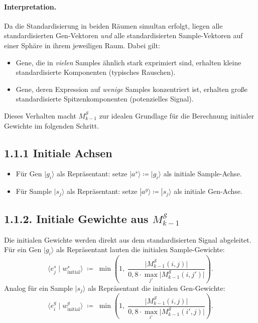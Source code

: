 \paragraph{Interpretation.}
Da die Standardisierung in beiden R\"{a}umen simultan erfolgt, liegen
alle standardisierten Gen-Vektoren \emph{und} alle standardisierten
Sample-Vektoren auf einer Sph\"{a}re in ihrem jeweiligen Raum.  Dabei gilt:
\begin{itemize}
  \item Gene, die in \emph{vielen} Samples \"{a}hnlich stark exprimiert sind,
        erhalten kleine standardisierte Komponenten (typisches Rauschen).
  \item Gene, deren Expression auf \emph{wenige} Samples konzentriert ist,
        erhalten gro{\ss}e standardisierte Spitzenkomponenten
        (potenzielles Signal).
\end{itemize}
Dieses Verhalten macht $M^{\mathcal{S}}_{k-1}$ zur idealen Grundlage f\"{u}r
die Berechnung initialer Gewichte im folgenden Schritt.
 
\subsection*{1.1.1 Initiale Achsen}
 
\begin{itemize}
  \item F\"{u}r Gen $|g_i\rangle$ als Repr\"{a}sentant: setze
        $|a^s\rangle \coloneqq |g_i\rangle$ als initiale Sample-Achse.
  \item F\"{u}r Sample $|s_j\rangle$ als Repr\"{a}sentant: setze
        $|a^g\rangle \coloneqq |s_j\rangle$ als initiale Gen-Achse.
\end{itemize}
 
\subsection*{1.1.2. Initiale Gewichte aus $M^{\mathcal{S}}_{k-1}$}
 
Die initialen Gewichte werden direkt aus dem standardisierten Signal
abgeleitet.  F\"{u}r ein Gen $|g_i\rangle$ als Repr\"{a}sentant lauten die
initialen Sample-Gewichte:
\begin{equation}
    \langle e^s_j \mid w^s_{\mathrm{initial}} \rangle
    \;\coloneqq\;
    \min\!\left(1,\;
        \frac{\bigl|M^{\mathcal{S}}_{k-1}(i,j)\bigr|}
             {0{,}8 \cdot \max_{j'}\bigl|M^{\mathcal{S}}_{k-1}(i,j')\bigr|}
    \right).
\end{equation}
Analog f\"{u}r ein Sample $|s_j\rangle$ als Repr\"{a}sentant die initialen Gen-Gewichte:
\begin{equation}
    \langle e^g_i \mid w^g_{\mathrm{initial}} \rangle
    \;\coloneqq\;
    \min\!\left(1,\;
        \frac{\bigl|M^{\mathcal{S}}_{k-1}(i,j)\bigr|}
             {0{,}8 \cdot \max_{i'}\bigl|M^{\mathcal{S}}_{k-1}(i',j)\bigr|}
    \right).
\end{equation}
 

